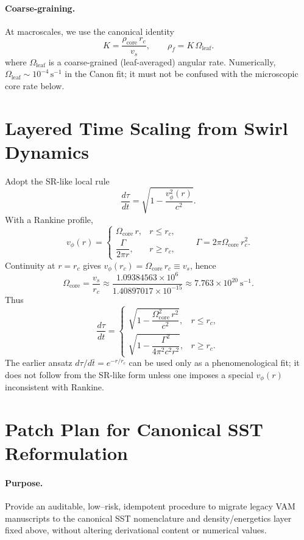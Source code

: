 \documentclass[11pt]{article}
\newcommand{\vscore}{v_s}                                %
\newcommand{\rhoF}{\rho_{\!f}}                           %
\newcommand{\rhoC}{\rho_{\mathrm{core}}} %
\begin{document}
		\paragraph{Coarse-graining.}
		At macroscales, we use the canonical identity
		\[
			K=\frac{\rhoC\,r_c}{\vscore},\qquad \rhoF=K\,\Omega_{\text{leaf}}.
		\]
		where $\Omega_{\text{leaf}}$ is a coarse-grained (leaf-averaged) angular rate. Numerically, $\Omega_{\text{leaf}}\sim 10^{-4}\,\mathrm{s^{-1}}$ in the Canon fit; it must not be confused with the microscopic core rate below.

	\section{Layered Time Scaling from Swirl Dynamics}
		Adopt the SR-like local rule
		\[
			\frac{d\tau}{dt}=\sqrt{1-\frac{v_\phi^{2}(r)}{c^{2}}}.
		\]
		With a Rankine profile,
		\[
			v_\phi(r)=
			\begin{cases}
				\Omega_{\text{core}}\,r, & r\le r_c,\\[4pt]
				\dfrac{\Gamma}{2\pi r}, & r\ge r_c,
			\end{cases}
			\qquad \Gamma=2\pi\Omega_{\text{core}}\,r_c^{2}.
		\]
		Continuity at $r=r_c$ gives $v_\phi(r_c)=\Omega_{\text{core}}\,r_c\equiv \vscore$, hence
		\[
			\Omega_{\text{core}}=\frac{\vscore}{r_c}\approx \frac{1.09384563\times 10^{6}}{1.40897017\times 10^{-15}}
			\approx 7.763\times 10^{20}\ \mathrm{s^{-1}}.
		\]
		Thus
		\[
			\frac{d\tau}{dt}=
			\begin{cases}
				\sqrt{1-\dfrac{\Omega_{\text{core}}^{2}\,r^{2}}{c^{2}}}, & r\le r_c,\\[6pt]
				\sqrt{1-\dfrac{\Gamma^{2}}{4\pi^{2}c^{2}r^{2}}}, & r\ge r_c.
			\end{cases}
		\]
		The earlier ansatz $d\tau/d\bar t=e^{-r/r_c}$ can be used only as a phenomenological fit; it does not follow from the SR-like form unless one imposes a special $v_\phi(r)$ inconsistent with Rankine.

\section{Patch Plan for Canonical SST Reformulation}\label{sec:patchplan}
\paragraph{Purpose.} Provide an auditable, low–risk, idempotent procedure to migrate legacy VAM manuscripts to the canonical SST nomenclature and density/energetics layer fixed above, without altering derivational content or numerical values.
\end{document}
